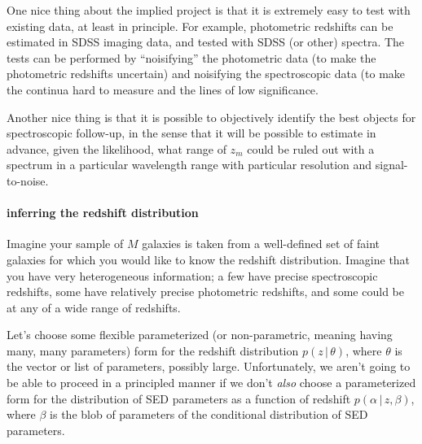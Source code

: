 \documentclass[12pt]{article}
\newcommand{\given}{\,|\,}
\begin{document}
One nice thing about the implied project is that it is extremely easy
to test with existing data, at least in principle.  For example,
photometric redshifts can be estimated in SDSS imaging data, and
tested with SDSS (or other) spectra.  The tests can be performed by
``noisifying'' the photometric data (to make the photometric redshifts
uncertain) and noisifying the spectroscopic data (to make the continua
hard to measure and the lines of low significance.

Another nice thing is that it is possible to objectively identify the
best objects for spectroscopic follow-up, in the sense that it will be
possible to estimate in advance, given the likelihood, what range of
$z_m$ could be ruled out with a spectrum in a particular wavelength
range with particular resolution and signal-to-noise.

\paragraph{inferring the redshift distribution}
Imagine your sample of $M$ galaxies is taken from a well-defined set
of faint galaxies for which you would like to know the redshift
distribution.  Imagine that you have very heterogeneous information; a
few have precise spectroscopic redshifts, some have relatively precise
photometric redshifts, and some could be at any of a wide range of
redshifts.

Let's choose some flexible parameterized (or non-parametric, meaning
having many, many parameters) form for the redshift distribution $p(z
\given \theta)$, where $\theta$ is the vector or list of parameters,
possibly large.  Unfortunately, we aren't going to be able to proceed
in a principled manner if we don't \emph{also} choose a parameterized
form for the distribution of SED parameters as a function of redshift
$p(\alpha \given z, \beta)$, where $\beta$ is the blob of parameters
of the conditional distribution of SED parameters.
\end{document}
